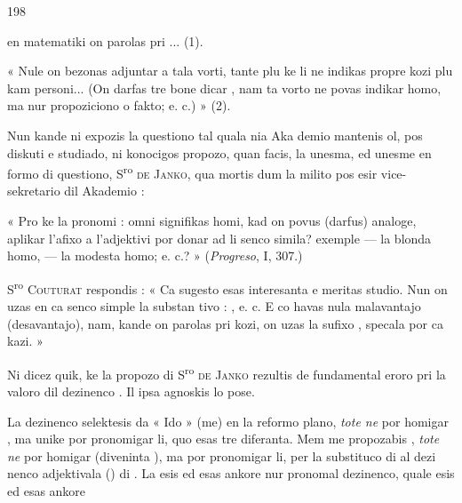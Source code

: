 \begin{VUpage}[202]{198}

\VUcontinue
en matematiki on parolas pri \cc
{}... (1).

« Nule on bezonas adjuntar  a tala vorti, tante plu ke\nl
li ne indikas propre kozi plu kam personi... (On darfas tre\nl
bone dicar , nam ta vorto ne povas indikar\nl
homo, ma nur propoziciono o fakto; e. c.) » (2).

Nun kande ni expozis la questiono tal quala nia Aka\cc
demio mantenis ol, pos diskuti e studiado, ni konocigos\nl
propozo, quan facis, la unesma, ed unesme en formo di\nl
questiono, S\textsuperscript{ro} \textsc{de Janko}, qua mortis dum la milito pos esir\nl
vice-sekretario dil Akademio :

« Pro ke la pronomi : \nl
omni signifikas homi, kad on povus (darfus) analoge,\nl
aplikar l'afixo  a l'adjektivi por donar ad li senco simila?\nl
exemple  --- la blonda homo,  --- la\nl
modesta homo; e. c.? » (\textit{Progreso}, I, 307.)

S\textsuperscript{ro} \textsc{Couturat} respondis : « Ca sugesto esas interesanta e\nl
meritas studio. Nun on uzas en ca senco simple la substan\cc
tivo : , e. c. E co havas nula malavantajo\nl
(desavantajo), nam, kande on parolas pri kozi, on uzas la\nl
sufixo , specala por ca kazi. »

Ni dicez quik, ke la propozo di S\textsuperscript{ro} \textsc{de Janko} rezultis de\nl
fundamental eroro pri la valoro dil dezinenco . Il ipsa\nl
agnoskis lo pose.

La dezinenco  selektesis da « Ido » (me) en la reformo\cc
plano, \textit{tote ne} por homigar , ma\nl
unike por pronomigar li, quo esas tre diferanta. Mem me\nl
propozabis , \textit{tote ne} por homigar  (diveninta\nl
{}), ma por pronomigar li, per la substituco di  al dezi\cc
nenco adjektivala () di . La  esis ed esas ankore\nl
nur pronomal dezinenco, quale  esis ed esas ankore\nl
\end{VUpage}

